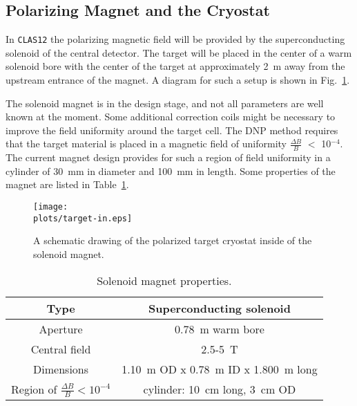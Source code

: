 \subsection{Polarizing Magnet and the Cryostat}

In {\tt CLAS12} the polarizing magnetic field will be provided by the 
superconducting solenoid of the central detector. The target will be 
placed in the center of a warm solenoid bore with the center of the target 
at approximately 2~m away from the upstream entrance of the magnet.  
A diagram for such a setup is shown in Fig.~\ref{target-in}.

The solenoid magnet is in the design stage, and not all parameters are well 
known at the moment. Some additional correction coils might be necessary to 
improve the field uniformity around the target cell. The DNP method requires 
that the target material is placed in a magnetic field of uniformity 
$\frac{\Delta B}{B}$ $<$ 10$^{-4}$. The current magnet design provides for 
such a region of field uniformity in a cylinder of 30~mm in diameter and 
100~mm in length. Some properties of the magnet are listed in 
Table~\ref{Magnet}. 

\begin{figure}[htbp]
\centering
\texttt{[image: \\plots/target-in.eps]}
\caption{\small{A schematic drawing of the polarized target cryostat inside 
of the solenoid magnet.}}
\label{target-in}
\end{figure}

\begin{table}[htbp]
\begin{center}
\begin{tabular}{|cc|} \hline
Type           & Superconducting solenoid \\ \hline 
Aperture       & 0.78~m warm bore \\ \hline
Central field  & 2.5-5~T \\ \hline
Dimensions     & 1.10~m OD x 0.78~m ID x 1.800~m long \\ \hline
Region of $\frac{\Delta B}{B} < 10^{-4}$ &  cylinder: 10~cm long, 3~cm OD \\ \hline
\end{tabular}
\end{center}
\caption{\small{Solenoid magnet properties.}}
\label{Magnet}
\end{table}


